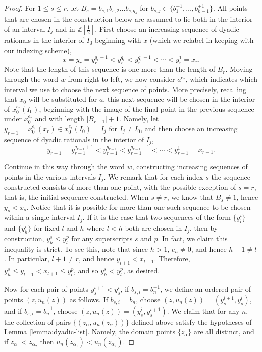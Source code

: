 \documentclass[11pt]{amsart}
\begin{document}
\begin{proof}
For $1 \leq s \leq r$, let $B_s=b_{s,1}b_{s,2} \dots b_{s,q_s}$ for $b_{s,j} \in
\{b_1^{\pm1}, \dots ,b_{k-1}^{\pm 1} \}$. All points that are
chosen in the construction below are assumed to lie both in the
interior of an interval $I_j$ and in ${\mathbb Z}[\frac{1}{2}]$. First
choose an increasing sequence of dyadic rationals in the interior
of $I_0$ beginning with $x$ (which we relabel in keeping with our
indexing scheme),
$$x=y_r=y_r^{q_r+1}< y_r^{q_r} < y_r^{q_r-1} < \cdots <
y_r^1=x_r.$$ Note that the length of this sequence is one more
than the length of $B_r$.  Moving through the word $w$ from right
to left, we now consider $a^{e_r}$, which indicates
which interval we use to choose the next sequence of points. More precisely, recalling that $x_0$ will be substituted for $a$, this next sequence will be chosen in the interior of
$x_0^{e_r}(I_0)$, beginning with the image of the final point in the
previous sequence under $x_0^{e_r}$ and with length $|B_{r-1}|+1$.
Namely, let $y_{r-1}=x_0^{e_r}(x_r) \in x_0^{e_r}(I_0)=I_j$ for $I_j \neq
I_0$, and then choose an increasing sequence of dyadic rationals in
the interior of $I_j$,
$$y_{r-1}=y_{r-1}^{q_{r-1}+1} < y_{r-1}^{q_{r-1}} <
y_{r-1}^{q_{r-1}-1}< \cdots < y_{r-1}^1=x_{r-1}.$$

Continue in this way through the word $w$, constructing increasing sequences of points in
the various intervals $I_j$. We remark that for each index $s$ the sequence constructed consists of
more than one point, with the possible exception of $s=r$, that is, the initial sequence constructed.
When $s \neq r$, we know that $B_s \neq 1$, hence $y_s < x_s$.
Notice that it is possible for more than one such sequence to be chosen
within a single interval $I_j$. If it is the case that two sequences of the
form $\{ y_l^i \}$ and $\{y_h^i\}$ for fixed $l$ and $h$ where
$l<h$ both are chosen in $I_j$, then by construction, $y_h^s \leq y_l^p$ for any
superscripts $s$ and $p$. In fact, we claim this inequality is
strict. To see this, note that since $h >1$, $e_h \neq 0$, and
hence $h-1 \neq l$. In particular, $l+1 \neq r$, and hence
$y_{l+1} < x_{l+1}$. Therefore, $y_h^s \leq y_{l+1} < x_{l+1} \leq
y_l^p$, and so $y_h^s < y_l^p$, as desired.

Now for each pair of points $y_s^{i+1}<y_s^i$, if $b_{s,i}=b_n^{\pm1}$, we define an ordered pair of points $(z, u_n(z))$ as follows.
If $b_{s,i}=b_n$, choose $(z, u_n(z))=(y_s^{i+1},y_s^i)$, and if $b_{s,i}=b_n^{-1}$, choose $(z, u_n(z))=(y_s^i, y_s^{i+1})$.
We claim that for any $n$, the collection of pairs $\{(z_{\alpha},
u_n(z_{\alpha}))\}$ defined above satisfy the hypotheses of Lemma
\ref{lemma:dyadic-list}. Namely, the domain points
$\{z_{\alpha}\}$ are all distinct, and if $z_{\alpha_1} <
z_{\alpha_2}$ then $u_n(z_{\alpha_1}) < u_n(z_{\alpha_2})$.


\end{proof}
\end{document}
